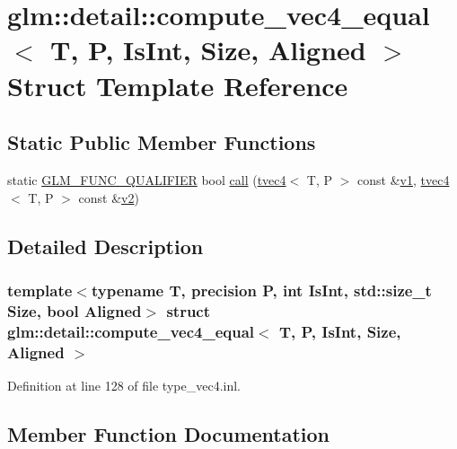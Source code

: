 \hypertarget{structglm_1_1detail_1_1compute__vec4__equal}{}\section{glm\+::detail\+::compute\+\_\+vec4\+\_\+equal$<$ T, P, Is\+Int, Size, Aligned $>$ Struct Template Reference}
\label{structglm_1_1detail_1_1compute__vec4__equal}
\subsection*{Static Public Member Functions}
\begin{DoxyCompactItemize}
\item 
static \mbox{\hyperlink{setup_8hpp_a33fdea6f91c5f834105f7415e2a64407}{G\+L\+M\+\_\+\+F\+U\+N\+C\+\_\+\+Q\+U\+A\+L\+I\+F\+I\+ER}} bool \mbox{\hyperlink{structglm_1_1detail_1_1compute__vec4__equal_ac3dd966aa94c6de05d4c324948abab27}{call}} (\mbox{\hyperlink{structglm_1_1tvec4}{tvec4}}$<$ T, P $>$ const \&\mbox{\hyperlink{glad_8h_a0779c3b73f9aa3a0ac5b0139b5d291d9}{v1}}, \mbox{\hyperlink{structglm_1_1tvec4}{tvec4}}$<$ T, P $>$ const \&\mbox{\hyperlink{glad_8h_a9a09a1837922b2b806f4589096a52049}{v2}})
\end{DoxyCompactItemize}


\subsection{Detailed Description}
\subsubsection*{template$<$typename T, precision P, int Is\+Int, std\+::size\+\_\+t Size, bool Aligned$>$\newline
struct glm\+::detail\+::compute\+\_\+vec4\+\_\+equal$<$ T, P, Is\+Int, Size, Aligned $>$}



Definition at line 128 of file type\+\_\+vec4.\+inl.



\subsection{Member Function Documentation}
\mbox{\label{structglm_1_1detail_1_1compute__vec4__equal_ac3dd966aa94c6de05d4c324948abab27}} 
